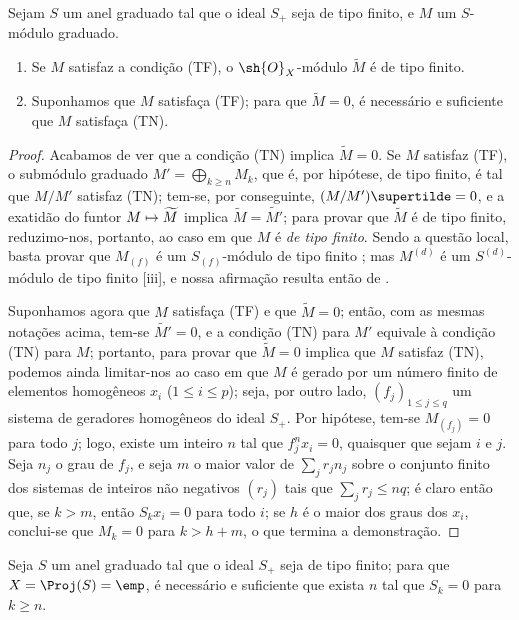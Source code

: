 \documentclass[oneside,10pt]{amsart}
\makeatletter
\renewcommand{\leq}{\leqslant}
\renewcommand{\geq}{\geqslant}
\newcommand{\ega@arrow}[2]{\mathchoice{#1}{#2}{#2}{#2}}
\let\ega@shortmapsto\mapsto
\renewcommand{\mapsto}{\ega@arrow{\longmapsto}{\ega@shortmapsto}}
\newcommand{\oldpage}[2][]{\marginnote{\normalfont\footnotesize\textbf{#1}~|~#2}\ignorespaces}
\let\EGAOriginalLabel\label
\renewcommand{\label}[1]{\phantomsection\EGAOriginalLabel{#1}}
\makeatother
\begin{document}
\begin{proposition}[2.7.3]
\label{II.2.7.3}
Sejam $S$ um anel graduado tal que o ideal $S_+$ seja de tipo finito, e $M$ um $S$-módulo graduado.
\begin{enumerate}
  \item[{\rm(i)}] Se $M$ satisfaz a condição (TF), o $\sh{O}_X$-módulo $\widetilde{M}$ é de tipo finito.
  \item[{\rm(ii)}] Suponhamos que $M$ satisfaça (TF); para que $\widetilde{M}=0$, é necessário e suficiente que $M$ satisfaça (TN).
\end{enumerate}
\end{proposition}

\begin{proof}
Acabamos de ver que a condição (TN) implica $\widetilde{M}=0$.
Se $M$ satisfaz (TF), o submódulo graduado $M'=\bigoplus_{k\geq n}M_k$, que é, por hipótese, de tipo finito, é tal que $M/M'$ satisfaz (TN); tem-se, por conseguinte, $(M/M')\supertilde=0$, e a exatidão do funtor $M\mapsto\widetilde{M}$  implica $\widetilde{M}=\widetilde{M'}$; para provar que $\widetilde{M}$ é de tipo finito, reduzimo-nos, portanto, ao caso em que $M$ é \emph{de tipo finito}.
Sendo a questão local, basta provar que $M_{(f)}$ é um $S_{(f)}$-módulo de tipo finito ; mas $M^{(d)}$ é um $S^{(d)}$-módulo de tipo finito [iii], e nossa afirmação resulta então de .

Suponhamos agora que $M$ satisfaça (TF) e que $\widetilde{M}=0$; então, com as mesmas notações acima, tem-se $\widetilde{M'}=0$, e a condição (TN) para $M'$ equivale à condição (TN) para $M$; portanto, para provar que $\widetilde{M}=0$ implica que $M$ satisfaz (TN), podemos ainda limitar-nos ao caso em que $M$ é gerado por um número finito de elementos homogêneos $x_i$ ($1\leq i\leq p$); seja, por outro lado, $(f_j)_{1\leq j\leq q}$ um sistema de geradores homogêneos do ideal $S_+$.
Por hipótese, tem-se $M_{(f_j)}=0$ para todo $j$; logo, existe um inteiro $n$ tal que $f_j^nx_i=0$, quaisquer que sejam $i$ e $j$.
Seja $n_j$ o grau de $f_j$, e seja $m$ o maior valor de $\sum_j r_jn_j$ sobre o conjunto finito dos sistemas de inteiros não negativos $(r_j)$ tais que $\sum_j r_j\leq nq$; é claro então
\oldpage[II]{40}
que, se $k>m$, então $S_kx_i=0$ para todo $i$;
se $h$ é o maior dos graus dos $x_i$, conclui-se que $M_k=0$ para $k>h+m$, o que termina a demonstração.
\end{proof}

\begin{corollary}[2.7.4]
\label{II.2.7.4}
Seja $S$ um anel graduado tal que o ideal $S_+$ seja de tipo finito;
para que $X=\Proj(S)=\emp$, é necessário e suficiente que exista $n$ tal que $S_k=0$ para $k\geq n$.
\end{corollary}
\end{document}
